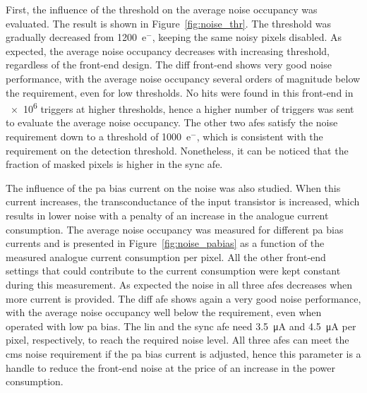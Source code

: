 First, the influence of the threshold on the average noise occupancy was evaluated. The result is shown in Figure~\ref{fig:noise_thr}. The threshold was gradually decreased from \num{1200}~e${^{-}}$, keeping the same noisy pixels disabled. As expected, the average noise occupancy decreases with increasing threshold, regardless of the front-end design. The \gls{diff} front-end shows very good noise performance, with the average noise occupancy several orders of magnitude below the requirement, even for low thresholds. No hits were found in this front-end in \num{e6} triggers at higher thresholds, hence a higher number of triggers was sent to evaluate the average noise occupancy. The other two \gls{afe}s satisfy the noise requirement down to a threshold of \num{1000}~e${^{-}}$, which is consistent with the requirement on the detection threshold. Nonetheless, it can be noticed that the fraction of masked pixels is higher in the \gls{sync} \gls{afe}.

The influence of the \gls{pa} bias current on the noise was also studied. When this current increases, the transconductance of the input transistor is increased, which results in lower noise with a penalty of an increase in the analogue current consumption. The average noise occupancy was measured for different \gls{pa} bias currents and is presented in Figure~\ref{fig:noise_pabias} as a function of the measured analogue current consumption per pixel. All the other front-end settings that could contribute to the current consumption were kept constant during this measurement. 
As expected the noise in all three \gls{afe}s decreases when more current is provided.
The \gls{diff} \gls{afe} shows again a very good noise performance, with the average noise occupancy well below the requirement, even when operated with low \gls{pa} bias. The \gls{lin} and the \gls{sync} \gls{afe} need \SI{3.5}{\micro\ampere} and \SI{4.5}{\micro\ampere} per pixel, respectively, to reach the required noise level. All three \gls{afe}s can meet the \gls{cms} noise requirement if the \gls{pa} bias current is adjusted, hence this parameter is a handle to reduce the front-end noise at the price of an increase in the power consumption.
